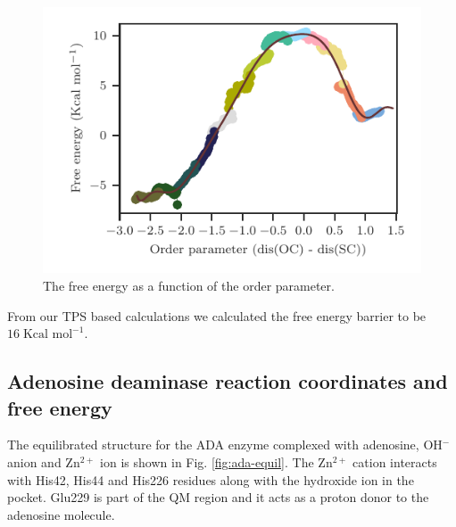 \documentclass[journal=jpcbfk,manuscript=article,layout=twocolumn]{achemso}
\begin{document}
\begin{figure}
\includegraphics[scale=1.0]{figures/mat2a-fenergy.pdf}
\caption{The free energy as a function of the order parameter.}
\end{figure}
From our TPS based calculations we calculated the free energy barrier to be 
$16\;\text{Kcal mol}^{-1}$.
\subsection{Adenosine deaminase reaction coordinates and free energy}
The equilibrated structure for the ADA enzyme complexed with adenosine, 
OH$^{-}$ anion and Zn$^{2+}$ ion is shown in Fig. \ref{fig:ada-equil}.
The Zn$^{2+}$ cation interacts with His42, His44 and His226 residues
along with the hydroxide ion in the pocket. Glu229 is part of the 
QM region and it acts as a proton donor to the adenosine molecule.  
\end{document}

